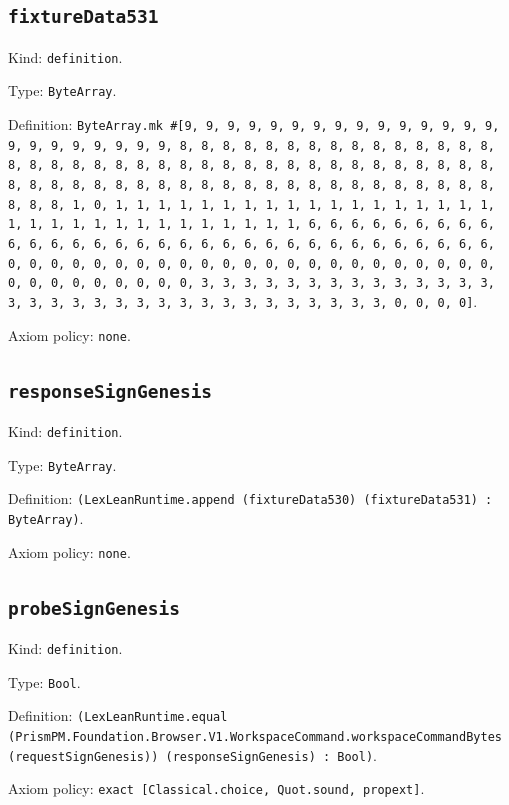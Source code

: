 \documentclass[11pt]{article}
\begin{document}
\subsection*{\texttt{fixtureData531}}
\noindent Kind: \texttt{definition}.\par
\noindent Type: \texttt{ByteArray}.\par
\noindent Definition: \texttt{ByteArray.mk \#[9, 9, 9, 9, 9, 9, 9, 9, 9, 9, 9, 9, 9, 9, 9, 9, 9, 9, 9, 9, 9, 9, 9, 8, 8, 8, 8, 8, 8, 8, 8, 8, 8, 8, 8, 8, 8, 8, 8, 8, 8, 8, 8, 8, 8, 8, 8, 8, 8, 8, 8, 8, 8, 8, 8, 8, 8, 8, 8, 8, 8, 8, 8, 8, 8, 8, 8, 8, 8, 8, 8, 8, 8, 8, 8, 8, 8, 8, 8, 8, 8, 8, 8, 8, 8, 8, 8, 1, 0, 1, 1, 1, 1, 1, 1, 1, 1, 1, 1, 1, 1, 1, 1, 1, 1, 1, 1, 1, 1, 1, 1, 1, 1, 1, 1, 1, 1, 1, 1, 1, 1, 6, 6, 6, 6, 6, 6, 6, 6, 6, 6, 6, 6, 6, 6, 6, 6, 6, 6, 6, 6, 6, 6, 6, 6, 6, 6, 6, 6, 6, 6, 6, 6, 0, 0, 0, 0, 0, 0, 0, 0, 0, 0, 0, 0, 0, 0, 0, 0, 0, 0, 0, 0, 0, 0, 0, 0, 0, 0, 0, 0, 0, 0, 0, 0, 3, 3, 3, 3, 3, 3, 3, 3, 3, 3, 3, 3, 3, 3, 3, 3, 3, 3, 3, 3, 3, 3, 3, 3, 3, 3, 3, 3, 3, 3, 3, 3, 0, 0, 0, 0]}.\par
\noindent Axiom policy: \texttt{none}.\par
\subsection*{\texttt{responseSignGenesis}}
\noindent Kind: \texttt{definition}.\par
\noindent Type: \texttt{ByteArray}.\par
\noindent Definition: \texttt{(LexLeanRuntime.append (fixtureData530) (fixtureData531) : ByteArray)}.\par
\noindent Axiom policy: \texttt{none}.\par
\subsection*{\texttt{probeSignGenesis}}
\noindent Kind: \texttt{definition}.\par
\noindent Type: \texttt{Bool}.\par
\noindent Definition: \texttt{(LexLeanRuntime.equal (PrismPM.Foundation.Browser.V1.WorkspaceCommand.workspaceCommandBytes (requestSignGenesis)) (responseSignGenesis) : Bool)}.\par
\noindent Axiom policy: \texttt{exact [Classical.choice, Quot.sound, propext]}.\par
\end{document}
